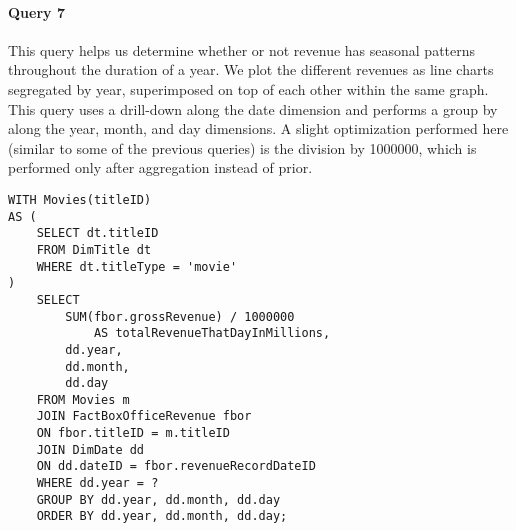 \paragraph{Query 7}
This query helps us determine whether or not revenue has seasonal patterns throughout the duration of a year. We plot the different revenues as line charts segregated by year, superimposed on top of each other within the same graph. This query uses a drill-down along the date dimension and performs a group by along the year, month, and day dimensions. A slight optimization performed here (similar to some of the previous queries) is the division by 1000000, which is performed only after aggregation instead of prior.
\begin{lstlisting}
WITH Movies(titleID) 
AS ( 
    SELECT dt.titleID
    FROM DimTitle dt
    WHERE dt.titleType = 'movie'
)
    SELECT 
        SUM(fbor.grossRevenue) / 1000000 
            AS totalRevenueThatDayInMillions, 
        dd.year, 
        dd.month, 
        dd.day
    FROM Movies m
    JOIN FactBoxOfficeRevenue fbor 
    ON fbor.titleID = m.titleID
    JOIN DimDate dd 
    ON dd.dateID = fbor.revenueRecordDateID
    WHERE dd.year = ?
    GROUP BY dd.year, dd.month, dd.day
    ORDER BY dd.year, dd.month, dd.day;
\end{lstlisting}

